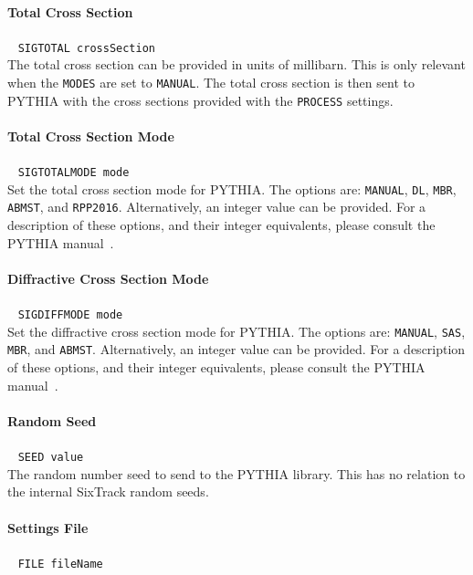 \paragraph{Total Cross Section}~ \texttt{SIGTOTAL crossSection}\\

The total cross section can be provided in units of millibarn.
This is only relevant when the \texttt{MODES} are set to \texttt{MANUAL}.
The total cross section is then sent to PYTHIA with the cross sections provided with the \texttt{PROCESS} settings.

\paragraph{Total Cross Section Mode}~ \texttt{SIGTOTALMODE mode}\\

Set the total cross section mode for PYTHIA.
The options are: \texttt{MANUAL}, \texttt{DL}, \texttt{MBR}, \texttt{ABMST}, and \texttt{RPP2016}.
Alternatively, an integer value can be provided.
For a description of these options, and their integer equivalents, please consult the PYTHIA manual~\cite{pythia8}.

\paragraph{Diffractive Cross Section Mode}~ \texttt{SIGDIFFMODE mode}\\

Set the diffractive cross section mode for PYTHIA.
The options are: \texttt{MANUAL}, \texttt{SAS}, \texttt{MBR}, and \texttt{ABMST}.
Alternatively, an integer value can be provided.
For a description of these options, and their integer equivalents, please consult the PYTHIA manual~\cite{pythia8}.

\paragraph{Random Seed}~ \texttt{SEED value}\\

The random number seed to send to the PYTHIA library.
This has no relation to the internal SixTrack random seeds.

\paragraph{Settings File}~ \texttt{FILE fileName}\\

